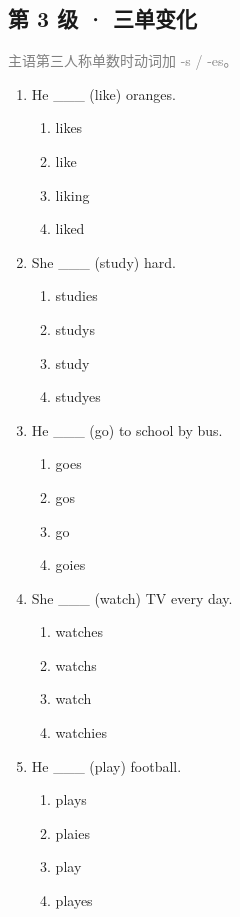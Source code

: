 \documentclass[11pt,a4paper]{ctexart}
\begin{document}
\subsection*{第 3 级 · 三单变化}
\noindent\textcolor{gray}{主语第三人称单数时动词加 -s / -es。}\par\smallskip
\begin{enumerate}[leftmargin=*,itemsep=4pt]
\item He \_\_\_ (like) oranges.
\begin{enumerate}[label=\Alph*.,leftmargin=2em,itemsep=1pt,topsep=2pt]
\item likes
\item like
\item liking
\item liked
\end{enumerate}
\item She \_\_\_ (study) hard.
\begin{enumerate}[label=\Alph*.,leftmargin=2em,itemsep=1pt,topsep=2pt]
\item studies
\item studys
\item study
\item studyes
\end{enumerate}
\item He \_\_\_ (go) to school by bus.
\begin{enumerate}[label=\Alph*.,leftmargin=2em,itemsep=1pt,topsep=2pt]
\item goes
\item gos
\item go
\item goies
\end{enumerate}
\item She \_\_\_ (watch) TV every day.
\begin{enumerate}[label=\Alph*.,leftmargin=2em,itemsep=1pt,topsep=2pt]
\item watches
\item watchs
\item watch
\item watchies
\end{enumerate}
\item He \_\_\_ (play) football.
\begin{enumerate}[label=\Alph*.,leftmargin=2em,itemsep=1pt,topsep=2pt]
\item plays
\item plaies
\item play
\item playes
\end{enumerate}

\end{enumerate}
\end{document}
